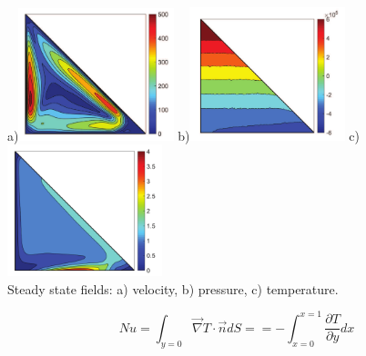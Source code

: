 \begin{center}
a)\includegraphics[width=4.5cm]{python_codes/fieldstone_51/jolm17_vel}
b)\includegraphics[width=4.5cm]{python_codes/fieldstone_51/jolm17_p}
c)\includegraphics[width=4.5cm]{python_codes/fieldstone_51/jolm17_T}\\
{\small Steady state fields: a) velocity, b) pressure, c) temperature.}
\end{center}


\[
Nu
=\int_{y=0} \vec{\nabla}T \cdot \vec{n} dS = 
=-\int_{x=0}^{x=1} \frac{\partial T}{\partial y} dx 
\]
